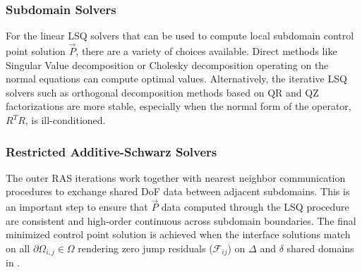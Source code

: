 \subsubsection{Subdomain Solvers}

For the linear LSQ solvers that can be used to compute local subdomain control point solution $\vec{P}$, there are a variety of choices available. Direct methods like Singular Value decomposition or Cholesky decomposition operating on the normal equations \cite{bjorck1996} can compute optimal values. Alternatively, the iterative LSQ solvers such as orthogonal decomposition methods based on QR and QZ factorizations are more stable, especially when the normal form of the operator, $R^T R$, is ill-conditioned. %

\subsubsection{Restricted Additive-Schwarz Solvers}

The outer RAS iterations work together with nearest neighbor communication procedures to exchange shared DoF data between adjacent subdomains. This is an important step to ensure that $\vec{P}$ data computed through the LSQ procedure are consistent and high-order continuous across subdomain boundaries. The final minimized control point solution is achieved when the interface solutions match on all $\partial \Omega_{i,j} \in \Omega$ rendering zero jump residuals ($\mathcal{F}_{ij}$) on $\Delta$ and $\delta$ shared domains in .






